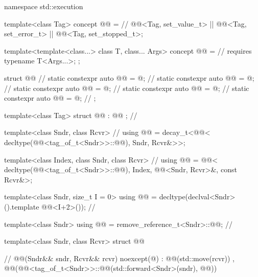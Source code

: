 \begin{codeblock}
namespace std::execution {
  template<class Tag>
  concept @@ =                                      // \expos
    @@<Tag, set_value_t> || @@<Tag, set_error_t> || @@<Tag, set_stopped_t>;

  template<template<class...> class T, class... Args>
  concept @@ =                                // \expos
    requires { typename T<Args...>; };

  struct @@ {                                        // \expos
    static constexpr auto @@ = @\seebelow@;              // \expos
    static constexpr auto @@ = @\seebelow@;                // \expos
    static constexpr auto @@ = @\seebelow@;              // \expos
    static constexpr auto @@ = @\seebelow@;                  // \expos
    static constexpr auto @@ = @\seebelow@;               // \expos
  };

  template<class Tag>
  struct @@ : @@ {};       // \expos

  template<class Sndr, class Rcvr>                              // \expos
  using @@ = decay_t<@@<
    decltype(@@<tag_of_t<Sndr>>::@@), Sndr, Rcvr&>>;

  template<class Index, class Sndr, class Rcvr>                 // \expos
  using @@ = @@<
    decltype(@@<tag_of_t<Sndr>>::@@), Index,
    @@<Sndr, Rcvr>&, const Rcvr&>;

  template<class Sndr, size_t I = 0>
  using @@ = decltype(declval<Sndr>().template @@<I+2>());     // \expos

  template<class Sndr>
  using @@ = remove_reference_t<Sndr>::@@;           // \expos

  template<class Sndr, class Rcvr>
  struct @@ {                                          // \expos
    @@(Sndr&& sndr, Rcvr&& rcvr) noexcept(@\seebelow@)
      : @@(std::move(rcvr))
      , @@(@@<tag_of_t<Sndr>>::@@(std::forward<Sndr>(sndr), @@)) { }

}}
\end{codeblock}
